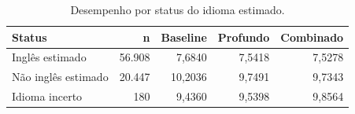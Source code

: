 \begin{table}[htbp]
\centering\small
\caption{Desempenho por status do idioma estimado.}
\label{tab:idiomas}
\begin{tabular}{lrrrr}
\toprule
Status & n & Baseline & Profundo & Combinado \\
\midrule
Inglês estimado & 56.908 & 7,6840 & 7,5418 & 7,5278 \\
Não inglês estimado & 20.447 & 10,2036 & 9,7491 & 9,7343 \\
Idioma incerto & 180 & 9,4360 & 9,5398 & 9,8564 \\
\bottomrule
\end{tabular}
\end{table}
